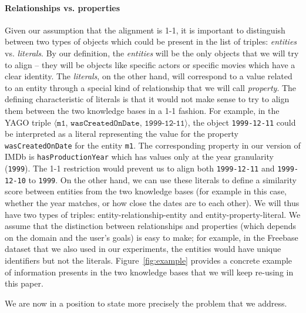 \documentclass{sig-alternate}
\renewcommand{\tt}[1]{\texttt{#1}}
\begin{document}
\paragraph*{Relationships vs. properties} Given our assumption that the alignment is 1-1, it is important to  distinguish between two types of objects which could be present in the list of triples: \emph{entities} vs. \emph{literals}. By our definition, the \emph{entities} will be the only objects that we will try to align -- they will be objects like specific actors or specific movies which have a clear identity. The \emph{literals}, on the other hand, will correspond to a value related to an entity through a special kind of relationship that we will call \emph{property}. The defining characteristic of literals is that it would not make sense to try to align them between the two knowledge bases in a 1-1 fashion. For example, in the \textsf{YAGO} triple $\langle \tt{m1}$, $\tt{wasCreatedOnDate}$, $\tt{1999-12-11}\rangle$, the object \tt{1999-12-11} could be interpreted as a literal representing the value for the property \tt{wasCreated\-On\-Date} for the entity \tt{m1}. The corresponding property in our version of \textsf{IMDb} is \tt{has\-Production\-Year} which has values only at the year granularity (\tt{1999}). The 1-1 restriction would prevent us to align both \tt{1999-12-11} and \tt{1999-12-10} to \tt{1999}. On the other hand, we can use these literals to define a similarity score between entities from the two knowledge bases (for example in this case, whether the year matches, or how close the dates are to each other). We will thus have two types of triples: entity-relationship-entity and entity-property-literal. We assume that the distinction between relationships and properties (which depends on the domain and the user's goals) is easy to make; for example, in the \textsf{Freebase} dataset that we also used in our experiments, the entities would have unique identifiers but not the literals. Figure~\ref{fig:example} provides a concrete example of information presents in the two knowledge bases that we will keep re-using in this paper.

We are now in a position to state more precisely the problem that we address.
\end{document}
